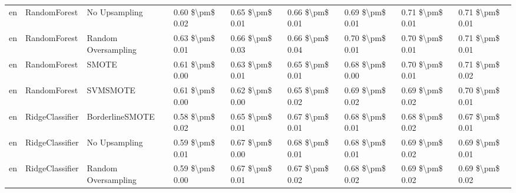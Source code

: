 \begin{tabular}{lllllllll}
      en &                    RandomForest &                 No Upsampling & 0.60 \$\textbackslash pm\$ 0.02 &           0.65 \$\textbackslash pm\$ 0.01 &       0.66 \$\textbackslash pm\$ 0.01 &        0.69 \$\textbackslash pm\$ 0.01 &                         0.71 \$\textbackslash pm\$ 0.01 &     0.71 \$\textbackslash pm\$ 0.01 \\
      en &                    RandomForest &           Random Oversampling & 0.63 \$\textbackslash pm\$ 0.01 &           0.66 \$\textbackslash pm\$ 0.03 &       0.66 \$\textbackslash pm\$ 0.04 &        0.70 \$\textbackslash pm\$ 0.01 &                         0.70 \$\textbackslash pm\$ 0.01 &     0.71 \$\textbackslash pm\$ 0.01 \\
      en &                    RandomForest &                         SMOTE & 0.61 \$\textbackslash pm\$ 0.00 &           0.63 \$\textbackslash pm\$ 0.01 &       0.65 \$\textbackslash pm\$ 0.01 &        0.68 \$\textbackslash pm\$ 0.00 &                         0.70 \$\textbackslash pm\$ 0.01 &     0.71 \$\textbackslash pm\$ 0.02 \\
      en &                    RandomForest &                      SVMSMOTE & 0.61 \$\textbackslash pm\$ 0.00 &           0.62 \$\textbackslash pm\$ 0.00 &       0.65 \$\textbackslash pm\$ 0.02 &        0.69 \$\textbackslash pm\$ 0.02 &                         0.69 \$\textbackslash pm\$ 0.02 &     0.70 \$\textbackslash pm\$ 0.01 \\
      en &                 RidgeClassifier &               BorderlineSMOTE & 0.58 \$\textbackslash pm\$ 0.02 &           0.65 \$\textbackslash pm\$ 0.01 &       0.67 \$\textbackslash pm\$ 0.01 &        0.68 \$\textbackslash pm\$ 0.01 &                         0.68 \$\textbackslash pm\$ 0.02 &     0.67 \$\textbackslash pm\$ 0.01 \\
      en &                 RidgeClassifier &                 No Upsampling & 0.59 \$\textbackslash pm\$ 0.01 &           0.67 \$\textbackslash pm\$ 0.00 &       0.68 \$\textbackslash pm\$ 0.01 &        0.68 \$\textbackslash pm\$ 0.01 &                         0.69 \$\textbackslash pm\$ 0.02 &     0.69 \$\textbackslash pm\$ 0.01 \\
      en &                 RidgeClassifier &           Random Oversampling & 0.59 \$\textbackslash pm\$ 0.00 &           0.67 \$\textbackslash pm\$ 0.01 &       0.67 \$\textbackslash pm\$ 0.02 &        0.68 \$\textbackslash pm\$ 0.02 &                         0.69 \$\textbackslash pm\$ 0.02 &     0.69 \$\textbackslash pm\$ 0.02 \\

\end{tabular}
